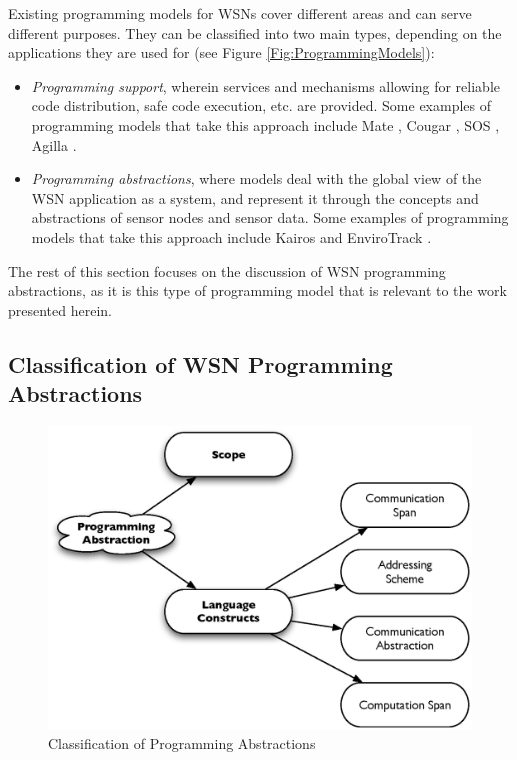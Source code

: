 Existing programming models for WSNs cover different areas and can serve 
different purposes. They can be classified into two main types, depending on 
the applications they are used for  \cite{hadim_middleware:2006} (see Figure
\ref{Fig:ProgrammingModels}):
\begin{itemize}
\item \emph{Programming support}, wherein services and mechanisms allowing for 
reliable code distribution, safe code execution, etc. are provided. Some
examples of programming models that take this approach include Mate
\cite{Levis_Mate:2002}, Cougar \cite{Bonnet_Cougar:2001}, SOS
\cite{Han_SOS:2005}, Agilla \cite{Fok_Agilla:2005}.
\item \emph{Programming abstractions}, where models deal with the global view 
of the WSN application as a system, and represent it through the concepts and 
abstractions of sensor nodes and sensor data. Some
examples of programming models that take this approach include Kairos
\cite{gummadi_Kairos:2005} and
EnviroTrack \cite{Abdelzaher_EnviroTrack:2004} .
\end{itemize}

The rest of this section focuses on the discussion of WSN programming
abstractions, as it is this type of programming model that is relevant to the
work presented herein.

\subsection{Classification of WSN Programming Abstractions}

\begin{figure}
\centering
\label{Fig:ProgrAbstrClassification}
\includegraphics[scale=0.6]{img/ProgAbstr_Classification.eps}
\caption{Classification of Programming Abstractions} 
\end{figure} 


